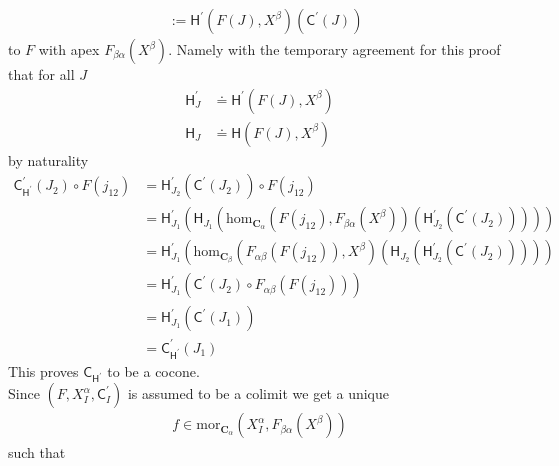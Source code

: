 \begin{prf}
\begin{align*}
  &:=
  \mathsf{H}^{\prime}(F(J),X^{\beta})
  \left(
    \mathsf{C}^{\prime}(J)
  \right)
\end{align*}
to $F$ with apex $F_{\beta\alpha}(X^{\beta})$. Namely with the temporary agreement for this proof that for all $J$
\begin{align*}
  \mathsf{H}_{J}^{\prime}
  &\doteq
  \mathsf{H}^{\prime}(F(J),X^{\beta})
  \\
  \mathsf{H}_{J}
  &\doteq
  \mathsf{H}(F(J),X^{\beta})
\end{align*}
by naturality
\begin{align*}
  \mathsf{C}_{\mathsf{H}^{\prime}}^{\prime}(J_{2})
  \circ
  F(j_{12})
  &=
  \mathsf{H}_{J_{2}}^{\prime}
  \left(
    \mathsf{C}^{\prime}(J_{2})
  \right)
  \circ
  F(j_{12})
  \\
  &=
  \mathsf{H}_{J_{1}}^{\prime}
  \left(
    \mathsf{H}_{J_{1}}
    \left(
      \mathrm{hom}_{\mathbf{C}_{\alpha}}
      \left(
        F(j_{12}),
        F_{\beta\alpha}(X^{\beta})
      \right)
      \left(
        \mathsf{H}_{J_{2}}^{\prime}
        \left(
        \mathsf{C}^{\prime}(J_{2})
        \right)
      \right)
    \right)
  \right)
  \\
  &=
  \mathsf{H}_{J_{1}}^{\prime}
  \left(
    \mathrm{hom}_{\mathbf{C}_{\beta}}
    \left(
      F_{\alpha\beta}
      \left(
        F(j_{12})
      \right),
      X^{\beta}
    \right)
    \left(
      \mathsf{H}_{J_{2}}
      \left(
        \mathsf{H}_{J_{2}}^{\prime}
        \left(
        \mathsf{C}^{\prime}(J_{2})
        \right)
      \right)
    \right)
  \right)
  \tag{NT}
  \\
  &=
  \mathsf{H}_{J_{1}}^{\prime}
  \left(
    \mathsf{C}^{\prime}(J_{2})
    \circ
    F_{\alpha\beta}
    \left(
      F(j_{12})
    \right)
  \right)
  \\
  &=
  \mathsf{H}_{J_{1}}^{\prime}
  \left(
    \mathsf{C}^{\prime}(J_{1})
  \right)
  \\
  &=
  \mathsf{C}_{\mathsf{H}^{\prime}}^{\prime}(J_{1})
\end{align*}
This proves $\mathsf{C}_{\mathsf{H}^{\prime}}$ to be a cocone.
\\
Since $(F,X_{I}^{\alpha},\mathsf{C}_{I}^{\prime})$ is assumed to be a colimit we get a unique
\begin{align*}
  f
  \in
  \mathrm{mor}_{\mathbf{C}_{\alpha}}
  \left(
    X_{I}^{\alpha},
    F_{\beta\alpha}(X^{\beta})
  \right)
\end{align*}
such that
\[
\begin{tikzcd}[sep=huge]

\end{tikzcd}\]
\end{prf}
